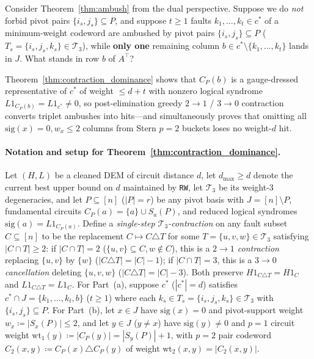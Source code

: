 \documentclass[12pt]{article}
\theoremstyle{definition}
\newcommand{\Tc}{\mathcal{T}_3}
\newcommand{\ttt}[1]{\texttt{#1}}
\begin{document}
Consider Theorem~\ref{thm:ambush} from the dual perspective. Suppose we do \emph{not} forbid pivot pairs $\{i_s,
j_s\} \subseteq P$, and suppose $t \ge 1$ faults $k_1, \dots, k_t \in c^*$ of a minimum-weight codeword are
ambushed by pivot pairs $\{i_s, j_s\} \subseteq P$ ($T_s = \{i_s, j_s, k_s\} \in \Tc$), while \textbf{only one}
remaining column $b \in c^* \setminus \{k_1, \dots, k_t\}$ lands in $J$. What stands in row $b$ of $A^\top$?

Theorem~\ref{thm:contraction_dominance} shows that $C_P(b)$ is a gauge-dressed representative of $c^*$ of weight
$\le d + t$ with nonzero logical syndrome $L 1_{C_P(b)} = L 1_{c^*} \neq 0$, so post-elimination greedy $2 \to 1$ /
$3 \to 0$ contraction converts triplet ambushes into hits---and simultaneously proves that omitting all
$\mathrm{sig}(x) = 0, w_x \le 2$ columns from Stern $p = 2$ buckets loses no weight-$d$ hit.

\paragraph{Notation and setup for Theorem~\ref{thm:contraction_dominance}.}
Let $(H, L)$ be a cleaned DEM of circuit distance $d$, let $d_{\max} \ge d$ denote the current best upper bound on
$d$ maintained by \ttt{RW}, let $\Tc$ be its weight-3 degeneracies, and let $P \subseteq [n]$ ($|P| = r$) be any
pivot basis with $J = [n] \setminus P$, fundamental circuits $C_P(a) = \{a\} \cup S_a(P)$, and reduced logical
syndromes $\mathrm{sig}(a) = L 1_{C_P(a)}$. Define a \emph{single-step $\Tc$-contraction} on any fault subset $C
\subseteq [n]$ to be the replacement $C \mapsto C \triangle T$ for some $T = \{u, v, w\} \in \Tc$ satisfying $|C
\cap T| \ge 2$: if $|C \cap T| = 2$ ($\{u, v\} \subseteq C, w \notin C$), this is a \emph{$2 \to 1$ contraction}
replacing $\{u, v\}$ by $\{w\}$ ($|C \triangle T| = |C| - 1$); if $|C \cap T| = 3$, this is a \emph{$3 \to 0$
cancellation} deleting $\{u, v, w\}$ ($|C \triangle T| = |C| - 3$). Both preserve $H 1_{C \triangle T} = H 1_C$ and
$L 1_{C \triangle T} = L 1_C$. For Part~(a), suppose $c^*$ ($|c^*| = d$) satisfies $c^* \cap J = \{k_1, \dots, k_t,
b\}$ ($t \ge 1$) where each $k_s \in T_s = \{i_s, j_s, k_s\} \in \Tc$ with $\{i_s, j_s\} \subseteq P$. For
Part~(b), let $x \in J$ have $\mathrm{sig}(x) = 0$ and pivot-support weight $w_x \coloneqq |S_x(P)| \le 2$, and let
$y \in J$ ($y \neq x$) have $\mathrm{sig}(y) \neq 0$ and $p = 1$ circuit weight $\mathrm{wt}_1(y) \coloneqq
|C_P(y)| = |S_y(P)| + 1$, with $p = 2$ pair codeword $C_2(x, y) \coloneqq C_P(x) \triangle C_P(y)$ of weight
$\mathrm{wt}_2(x, y) = |C_2(x, y)|$.
\end{document}
